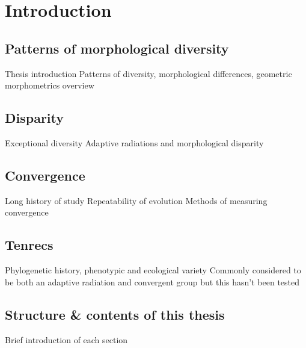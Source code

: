 \chapter{Introduction}
\label{chap:introduction}



\noindent


\section{Patterns of morphological diversity}
Thesis introduction
Patterns of diversity, morphological differences, geometric morphometrics overview

\section{Disparity}
Exceptional diversity
Adaptive radiations and morphological disparity

\section{Convergence}
Long history of study
Repeatability of evolution
Methods of measuring convergence

\section{Tenrecs}
Phylogenetic history, phenotypic and ecological variety
Commonly considered to be both an adaptive radiation and convergent group but this hasn't been tested

\section{Structure \& contents of this thesis}
Brief introduction of each section


